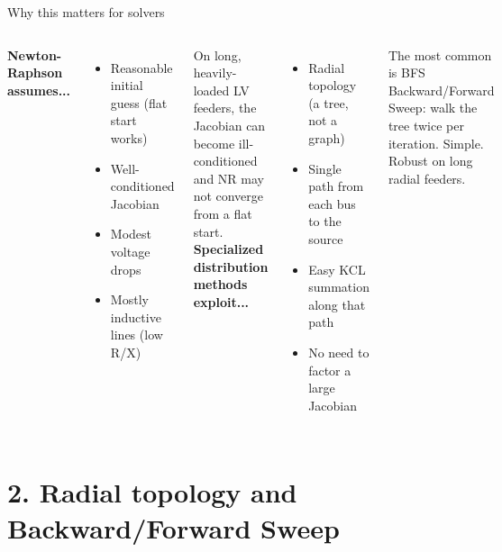 \documentclass[aspectratio=169,10pt]{beamer}
\begin{document}
\begin{frame}{Why this matters for solvers}
\begin{columns}[T]
\textbf{Newton-Raphson assumes...}
\begin{itemize}
  \item Reasonable initial guess (flat start works)
  \item Well-conditioned Jacobian
  \item Modest voltage drops
  \item Mostly inductive lines (low R/X)
\end{itemize}
\vspace{0.4em}
On long, heavily-loaded LV feeders, the Jacobian can become ill-conditioned and NR may not converge from a flat start.
\textbf{Specialized distribution methods exploit...}
\begin{itemize}
  \item Radial topology (a tree, not a graph)
  \item Single path from each bus to the source
  \item Easy KCL summation along that path
  \item No need to factor a large Jacobian
\end{itemize}
\vspace{0.4em}
\begin{block}{The most common is BFS}
Backward/Forward Sweep: walk the tree twice per iteration. Simple. Robust on long radial feeders.
\end{block}
\end{columns}
\end{frame}

\section*{2. Radial topology and Backward/Forward Sweep}
\end{document}
